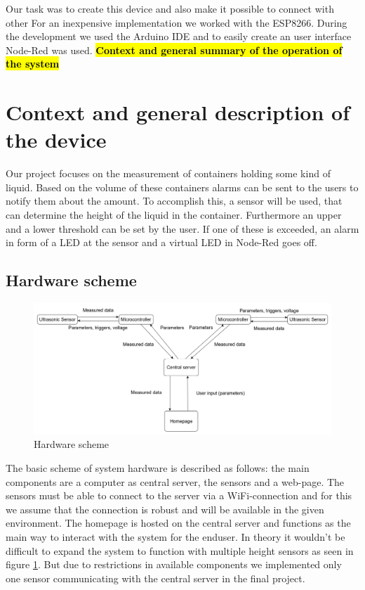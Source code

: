 \documentclass{article}
\begin{document}
Our task was to create this device and also make it possible to connect with
other For an inexpensive implementation we worked with the ESP8266. During the
development we used the Arduino IDE and to easily create an user interface
Node-Red was used. \textcolor{red}{\textbf{\hl{Context and general summary of
      the operation of the system}}}

\section{Context and general description of the device}

Our project focuses on the measurement of containers holding some kind of
liquid. Based on the volume of these containers alarms can be sent to the users
to notify them about the amount. To accomplish this, a sensor will be used, that
can determine the height of the liquid in the container. Furthermore an upper
and a lower threshold can be set by the user. If one of these is exceeded, an
alarm in form of a LED at the sensor and a virtual LED in Node-Red goes off.\par

\subsection{Hardware scheme}

\begin{figure}[h]
  \hspace{-1cm} \includegraphics[scale=0.325]{images/circuit3.png}
  \caption{Hardware scheme}
  \label{scheme}
\end{figure}

The basic scheme of system hardware is described as follows: the main components
are a computer as central server, the sensors and a web-page. The sensors must
be able to connect to the server via a WiFi-connection and for this we assume
that the connection is robust and will be available in the given environment.
The homepage is hosted on the central server and functions as the main way to
interact with the system for the enduser. In theory it wouldn't be difficult to
expand the system to function with multiple height sensors as seen in figure
\ref{scheme}. But due to restrictions in available components we implemented
only one sensor communicating with the central server in the final project.\par
\end{document}
